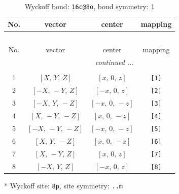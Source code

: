 \documentclass[fleqn,8pt]{jsarticle}
\begin{document}
\renewcommand{\arraystretch}{1.2}
\begin{longtable}{cccc}
\caption{Wyckoff bond: {\tt 16c@8o}, bond symmetry: {\tt 1}}
 \\
 \hline \hline
No. & vector & center & mapping \\ \hline \endfirsthead

\multicolumn{3}{l}{\tablename\ \thetable{}} \\
 \hline \hline
No. & vector & center & mapping \\ \hline \endhead

 \hline \hline
\multicolumn{3}{r}{\footnotesize\it continued ...} \\ \endfoot

 \hline \hline
\multicolumn{3}{r}{} \\ \endlastfoot

1 & $\left[ X,\, Y,\, Z \right]$ & $\left[ x,\, 0,\, z \right]$ & {\tt [1]} \\ \hline
2 & $\left[ - X,\, - Y,\, Z \right]$ & $\left[ - x,\, 0,\, z \right]$ & {\tt [2]} \\ \hline
3 & $\left[ - X,\, Y,\, - Z \right]$ & $\left[ - x,\, 0,\, - z \right]$ & {\tt [3]} \\ \hline
4 & $\left[ X,\, - Y,\, - Z \right]$ & $\left[ x,\, 0,\, - z \right]$ & {\tt [4]} \\ \hline
5 & $\left[ - X,\, - Y,\, - Z \right]$ & $\left[ - x,\, 0,\, - z \right]$ & {\tt [5]} \\ \hline
6 & $\left[ X,\, Y,\, - Z \right]$ & $\left[ x,\, 0,\, - z \right]$ & {\tt [6]} \\ \hline
7 & $\left[ X,\, - Y,\, Z \right]$ & $\left[ x,\, 0,\, z \right]$ & {\tt [7]} \\ \hline
8 & $\left[ - X,\, Y,\, Z \right]$ & $\left[ - x,\, 0,\, z \right]$ & {\tt [8]} \\
\end{longtable}
* Wyckoff site: {\tt 8p}, site symmetry: {\tt ..m}
\renewcommand{\arraystretch}{1.2}
\end{document}
